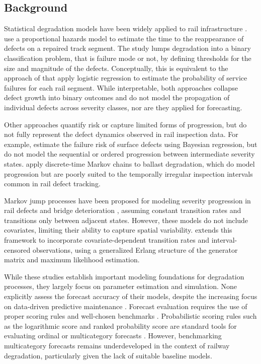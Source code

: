\subsection{Background} \label{sec:background}%
Statistical degradation models have been widely applied to rail infrastructure \citep{Davari2021AIndustry}.
\citet{ghofrani2019a} use a proportional hazards model to estimate the time to the reappearance of defects on a repaired track segment. The study lumps degradation into a binary classification problem, that is failure mode or not, by defining thresholds for the size and magnitude of the defects. Conceptually, this is equivalent to the approach of \citet{dick2003a} that apply logistic regression to estimate the probability of service failures for each rail segment. While interpretable, both approaches collapse defect growth into binary outcomes and do not model the propagation of individual defects across severity classes, nor are they applied for forecasting.

Other approaches quantify risk or capture limited forms of progression, but do not fully represent the defect dynamics observed in rail inspection data. For example, \citet{jamshidi2016a} estimate the failure risk of surface defects using Bayesian regression, but do not model the sequential or ordered progression between intermediate severity states. \citet{bressi2021a} apply discrete-time Markov chains to ballast degradation, which do model progression but are poorly suited to the temporally irregular inspection intervals common in rail defect tracking.

Markov jump processes have been proposed for modeling severity progression in rail defects \citep{podofillini2006a} and bridge deterioration \citep{sun2024a}, assuming constant transition rates and transitions only between adjacent states. However, these models do not include covariates, limiting their ability to capture spatial variability. \citet{bisgaard2024A} extends this framework to incorporate covariate-dependent transition rates and interval-censored observations, using a generalized Erlang structure of the generator matrix and maximum likelihood estimation.

While these studies establish important modeling foundations for degradation processes, they largely focus on parameter estimation and simulation. None explicitly assess the forecast accuracy of their models, despite the increasing focus on data-driven predictive maintenance \citep{Binder2023}. Forecast evaluation requires the use of proper scoring rules \citep{Gneiting2007} and well-chosen benchmarks \citep{Hyndman2014}. Probabilistic scoring rules such as the logarithmic score and ranked probability score are standard tools for evaluating ordinal or multicategory forecasts \citep{Epstein1969,friedman1983a}. However, benchmarking multicategory forecasts remains underdeveloped in the context of railway degradation, particularly given the lack of suitable baseline models.

